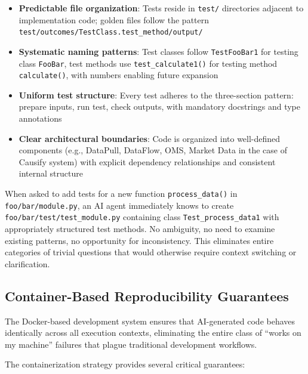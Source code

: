 \begin{itemize}
  \item \textbf{Predictable file organization}: Tests reside in \texttt{test/}
    directories adjacent to implementation code; golden files follow
    the pattern \texttt{test/outcomes/TestClass.test\_method/output/}

  \item \textbf{Systematic naming patterns}: Test classes follow
    \texttt{TestFooBar1} for testing class \texttt{FooBar}, test methods
    use \texttt{test\_calculate1()} for testing method \texttt{calculate()},
    with numbers enabling future expansion

  \item \textbf{Uniform test structure}: Every test adheres to the
    three-section pattern: prepare inputs, run test, check outputs,
    with mandatory docstrings and type annotations

  \item \textbf{Clear architectural boundaries}: Code is organized into
    well-defined components (e.g., DataPull, DataFlow, OMS, Market Data
    in the case of Causify system) with explicit dependency relationships and
    consistent internal structure
\end{itemize}

When asked to add tests for a new function \texttt{process\_data()} in
\texttt{foo/bar/module.py}, an AI agent immediately knows to create
\texttt{foo/bar/test/test\_module.py} containing class \texttt{Test\_process\_data1}
with appropriately structured test methods. No ambiguity, no need to
examine existing patterns, no opportunity for inconsistency. This
eliminates entire categories of trivial questions that would otherwise
require context switching or clarification.

\subsection{Container-Based Reproducibility Guarantees}

The Docker-based development system ensures that AI-generated code behaves
identically across all execution contexts, eliminating the entire class
of ``works on my machine'' failures that plague traditional development
workflows.

The containerization strategy provides several critical guarantees:

